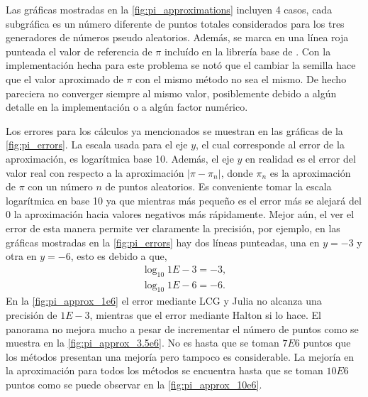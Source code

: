 \begin{enumerate}
\begin{solution}
        Las gráficas mostradas en la \cref{fig:pi_approximations} incluyen 4 casos, cada subgráfica es un número diferente de puntos totales considerados para los tres generadores de números pseudo aleatorios. Además, se marca en una línea roja punteada el valor de referencia de $\pi$ incluído en la librería base de . Con la implementación hecha para este problema se notó que el cambiar la semilla hace que el valor aproximado de $\pi$ con el mismo método no sea el mismo. De hecho pareciera no converger siempre al mismo valor, posiblemente debido a algún detalle en la implementación o a algún factor numérico.

        Los errores para los cálculos ya mencionados se muestran en las gráficas de la \cref{fig:pi_errors}. La escala usada para el eje $y$, el cual corresponde al error de la aproximación, es logarítmica base 10. Además, el eje $y$ en realidad es el error del valor real con respecto a la aproximación $|\pi - \pi_{n}|$, donde $\pi_n$ es la aproximación de $\pi$ con un número $n$ de puntos aleatorios. Es conveniente tomar la escala logarítmica en base 10 ya que mientras más pequeño es el error más se alejará del 0 la aproximación hacia valores negativos más rápidamente. Mejor aún, el ver el error de esta manera permite ver claramente la precisión, por ejemplo, en las gráficas mostradas en la \cref{fig:pi_errors} hay dos líneas punteadas, una en $y = -3$ y otra en $y = -6$, esto es debido a que,
        \begin{align}
            \log_{10}{1E-3} = -3, \\
            \log_{10}{1E-6} = -6 .
        \end{align}
        En la \cref{fig:pi_approx_1e6} el error mediante LCG y Julia no alcanza una precisión de $1E-3$, mientras que el error mediante Halton si lo hace. El panorama no mejora mucho a pesar de incrementar el número de puntos como se muestra en la \cref{fig:pi_approx_3.5e6}. No es hasta que se toman $7E6$ puntos que los métodos presentan una mejoría pero tampoco es considerable. La mejoría en la aproximación para todos los métodos se encuentra hasta que se toman $10E6$ puntos como se puede observar en la \cref{fig:pi_approx_10e6}.


\end{solution}
\end{enumerate}
